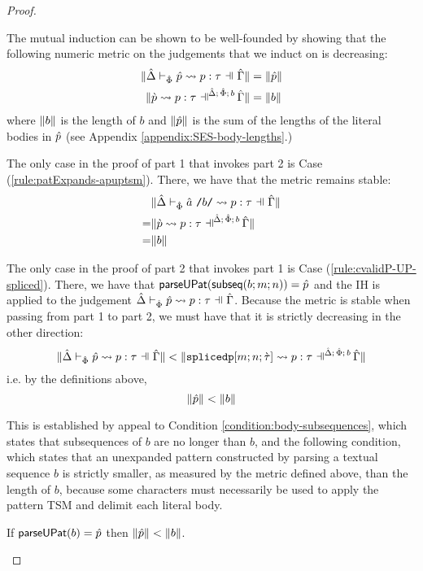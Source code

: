 {{{{\begin{proof}
\begin{enumerate}
\begin{byCases}
\begin{pfsteps*}
      \end{pfsteps*}
      \resetpfcounter
  \end{byCases}
  \end{enumerate}
The mutual induction can be shown to be well-founded by showing that the following numeric metric on the judgements that we induct on is decreasing:
\begin{align*}
\sizeof{\patExpands{\upctx}{\uPhi}{\upv}{p}{\tau}} & = \sizeof{\upv}\\
\sizeof{{\cvalidP{\upctx}{\pscene{\uDelta}{\uPhi}{b}}{\cpv}{p}{\tau}}} & = \sizeof{b}
\end{align*}
where $\Vert b \Vert$ is the length of $b$ and $\Vert \hat{p} \Vert$ is the sum of the lengths of the literal bodies in $\hat{p}$ (see Appendix \ref{appendix:SES-body-lengths}.)

The only case in the proof of part 1 that invokes part 2 is Case (\ref{rule:patExpands-apuptsm}). There, we have that the metric remains stable: \begin{align*}
 & \sizeof{\patExpands{\upctx}{\uPhi}{\utsmap{\tsmv}{b}}{p}{\tau}}\\
=& \sizeof{{\cvalidP{\upctx}{\pscene{\uDelta}{\uPhi}{b}}{\cpv}{p}{\tau}}}\\
=&\sizeof{b}\end{align*}

The only case in the proof of part 2 that invokes part 1 is Case (\ref{rule:cvalidP-UP-spliced}). There, we have that $\mathsf{parseUPat}(\mathsf{subseq}(b; m; n))=\hat{p}$ and the IH is applied to the judgement $\patExpands{\upctx}{\uPhi}{\upv}{p}{\tau}$. Because the metric is stable when passing from part 1 to part 2, we must have that it is strictly decreasing in the other direction:
\[\sizeof{\patExpands{\upctx}{\uPhi}{\upv}{p}{\tau}} < \sizeof{{\cvalidP{\upctx}{\pscene{\uDelta}{\uPhi}{b}}{\acesplicedp{m}{n}{\ctau}}{p}{\tau}}}\]
i.e. by the definitions above, 
\[\Vert \hat{p} \Vert < \Vert b \Vert\]

This is established by appeal to Condition \ref{condition:body-subsequences}, which states that subsequences of $b$ are no longer than $b$, and the following condition, which states that an unexpanded pattern constructed by parsing a textual sequence $b$ is strictly smaller, as measured by the metric defined above, than the length of $b$, because some characters must necessarily be used to apply the pattern TSM and delimit each literal body.
\begingroup
\def\thetheorem{\ref{condition:pattern-parsing}}
\begin{condition} If $\mathsf{parseUPat}(b)=\hat{p}$ then $\Vert \hat{p} \Vert < \Vert b \Vert$.\end{condition}
\endgroup


\end{proof}}}}}
